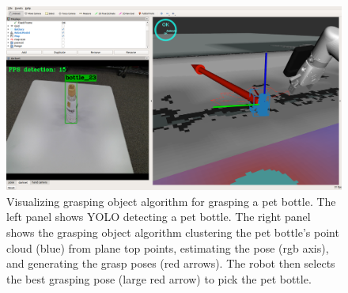 \documentclass[runningheads,a4paper]{llncs}
\begin{document}
\begin{figure}[tbp]
    \centering
    \includegraphics[width=0.6\linewidth]{images/grasp_object.png}
    \caption{Visualizing grasping object algorithm for grasping a pet bottle. The left panel shows YOLO detecting a pet bottle. The right panel shows the grasping object algorithm clustering the pet bottle’s point cloud (blue) from plane top points, estimating the pose (rgb axis), and generating the grasp poses (red arrows). The robot then selects the best grasping pose (large red arrow) to pick the pet bottle.}
    \label{fig:grasp_object}
\end{figure}
\end{document}
